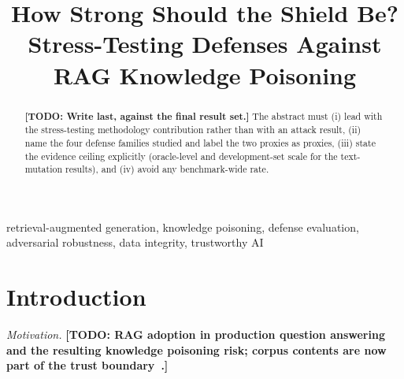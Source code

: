 \documentclass[conference]{IEEEtran}
\newcommand{\TODO}[1]{\textbf{[TODO: #1]}}
\begin{document}
\title{How Strong Should the Shield Be? \\ Stress-Testing Defenses Against RAG Knowledge Poisoning}

\author{
}

\maketitle

\begin{abstract}
\TODO{Write last, against the final result set.} The abstract must (i) lead with
the stress-testing methodology contribution rather than with an attack result,
(ii) name the four defense families studied and label the two proxies as proxies,
(iii) state the evidence ceiling explicitly (oracle-level and development-set
scale for the text-mutation results), and (iv) avoid any benchmark-wide rate.
\end{abstract}

\begin{IEEEkeywords}
retrieval-augmented generation, knowledge poisoning, defense evaluation,
adversarial robustness, data integrity, trustworthy AI
\end{IEEEkeywords}

\section{Introduction}
\label{sec:intro}

\textit{Motivation.}
\TODO{RAG adoption in production question answering and the resulting knowledge
poisoning risk; corpus contents are now part of the trust boundary~\cite{lewis2020rag,zou2025poisonedrag}.}
\end{document}
